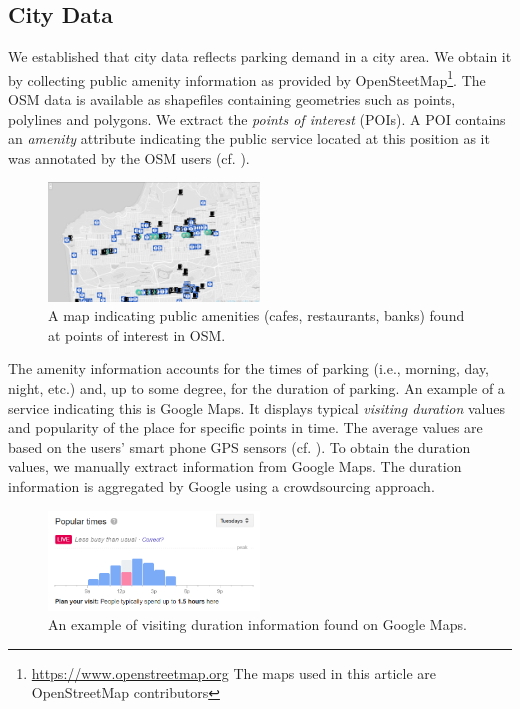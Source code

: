 \subsection{City Data}
\label{sec:citydata}
We established that city data reflects parking demand in a city area. We obtain it by collecting public amenity information as provided by OpenSteetMap\footnote{\url{https://www.openstreetmap.org} The maps used in this article are \textcopyright OpenStreetMap contributors}. The OSM data is available as shapefiles containing geometries such as points, polylines and polygons. We extract the \textit{points of interest} (POIs). A POI contains an \textit{amenity} attribute indicating the public service located at this position as it was annotated by the OSM users (cf. ).

\begin{figure}[!ht]
	\centering
	\includegraphics[width=0.5\textwidth]{graphics/cafes_restaurants_banks_larger.png}
	\caption{A map indicating public amenities (cafes, restaurants, banks) found at points of interest in OSM.}
	\label{fig:pois}
\end{figure}

The amenity information accounts for the times of parking (i.e., morning, day, night, etc.) and, up to some degree, for the duration of parking. An example of a service indicating this is Google Maps.
It displays typical \textit{visiting duration} values and popularity of the place for specific points in time. The average values are based on the users' smart phone GPS sensors (cf. ). To obtain the duration values, we manually extract information from Google Maps. The duration information is aggregated by Google using a crowdsourcing approach. 

\begin{figure}[!ht]
	\centering
	\includegraphics[width=0.5\textwidth]{graphics/google_visit_duration.png}
	\caption{An example of visiting duration information found on Google Maps.}
	\label{fig:visit_duration}
\end{figure}


